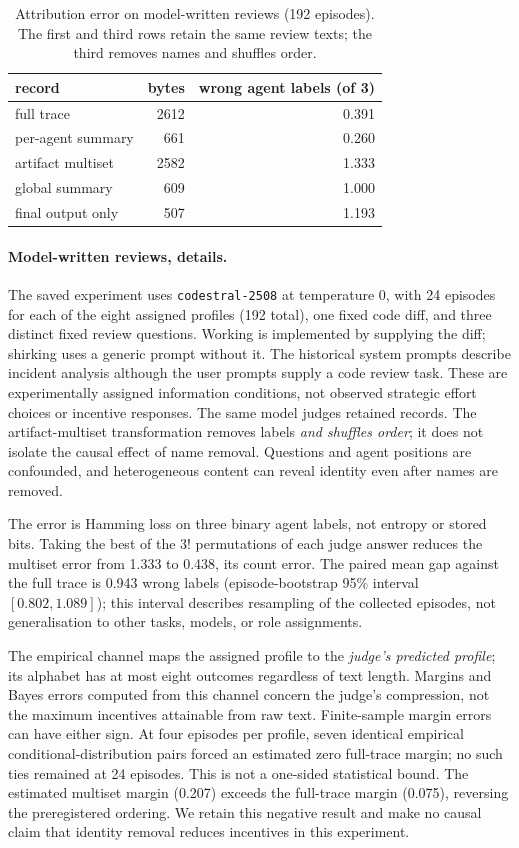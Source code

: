 \documentclass[sigconf,anonymous,acmthm=false]{aamas}
\theoremstyle{acmplain}
\theoremstyle{acmdefinition}
\begin{document}
\begin{table}[h]
\caption{Attribution error on model-written reviews (192 episodes). The first and third rows
retain the same review texts; the third removes names and shuffles order.}
\label{tab:llm}
\footnotesize
\begin{tabular}{@{}lrr@{}}
\toprule
record & bytes & wrong agent labels (of 3)\\
\midrule
full trace & 2612 & 0.391\\
per-agent summary & 661 & 0.260\\
artifact multiset & 2582 & 1.333\\
global summary & 609 & 1.000\\
final output only & 507 & 1.193\\
\bottomrule
\end{tabular}
\end{table}

\paragraph{Model-written reviews, details.} The saved experiment uses
\texttt{codestral-2508} at temperature 0, with 24 episodes for each of the eight
assigned profiles (192 total), one fixed code diff, and three distinct fixed
review questions. Working is implemented by supplying the diff; shirking uses
a generic prompt without it. The historical system prompts describe incident
analysis although the user prompts supply a code review task. These are
experimentally assigned information conditions, not observed strategic effort
choices or incentive responses. The same model judges retained records.
The artifact-multiset transformation removes labels \emph{and shuffles order};
it does not isolate the causal effect of name removal. Questions and agent
positions are confounded, and heterogeneous content can reveal identity even
after names are removed.

The error is Hamming loss on three binary agent labels, not entropy or stored
bits. Taking the best of the $3!$ permutations of each judge answer reduces
the multiset error from 1.333 to 0.438, its count error. The paired mean gap
against the full trace is 0.943 wrong labels (episode-bootstrap 95\% interval
$[0.802,1.089]$); this interval describes resampling of the collected episodes,
not generalisation to other tasks, models, or role assignments.

The empirical channel maps the assigned profile to the \emph{judge's predicted
profile}; its alphabet has at most eight outcomes regardless of text length.
Margins and Bayes errors computed from this channel concern the judge's
compression, not the maximum incentives attainable from raw text. Finite-sample
margin errors can have either sign. At four episodes per profile, seven
identical empirical conditional-distribution pairs forced an estimated zero
full-trace margin; no such ties remained at 24 episodes. This is not a
one-sided statistical bound. The estimated multiset margin (0.207) exceeds
the full-trace margin (0.075), reversing the preregistered ordering. We retain
this negative result and make no causal claim that identity removal reduces
incentives in this experiment.
\end{document}
